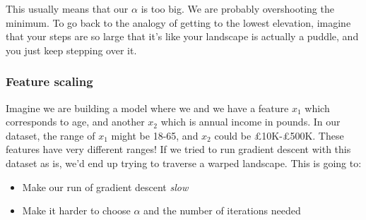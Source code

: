 \documentclass[11pt]{article}
\begin{document}
    This usually means that our $\alpha$ is too big. We are probably overshooting the minimum. To go back to the analogy of getting to the lowest elevation, imagine that your steps are so large that it's like your landscape is actually a puddle, and you just keep stepping over it. 

    \subsubsection{Feature scaling}

    Imagine we are building a model where we and we have a feature $x_1$ which corresponds to age, and another $x_2$ which is annual income in pounds. In our dataset, the range of $x_1$ might be 18-65, and $x_2$ could be £10K-£500K. These features have very different ranges! If we tried to run gradient descent with this dataset as is, we'd end up trying to traverse a warped landscape. This is going to:
    \begin{itemize}
	\item Make our run of gradient descent \textit{slow}
	\item Make it harder to choose $\alpha$ and the number of iterations needed
\end{itemize}
 
\end{document}
